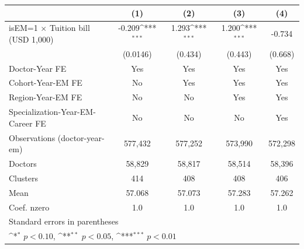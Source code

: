{
\def\sym#1{\ifmmode^{#1}\else\(^{#1}\)\fi}
\begin{tabular}{l*{4}{c}}
\hline\hline
                    &\multicolumn{1}{c}{(1)}         &\multicolumn{1}{c}{(2)}         &\multicolumn{1}{c}{(3)}         &\multicolumn{1}{c}{(4)}         \\
\hline
isEM=1 $\times$ Tuition bill (USD 1,000)&      -0.209\sym{***}&       1.293\sym{***}&       1.200\sym{***}&      -0.734         \\
                    &    (0.0146)         &     (0.434)         &     (0.443)         &     (0.668)         \\
[1em]
Doctor-Year FE      &         Yes         &         Yes         &         Yes         &         Yes         \\
[1em]
Cohort-Year-EM FE   &          No         &         Yes         &         Yes         &         Yes         \\
[1em]
Region-Year-EM FE   &          No         &          No         &         Yes         &         Yes         \\
[1em]
Specialization-Year-EM-Career FE&          No         &          No         &          No         &         Yes         \\
\hline
Observations (doctor-year-em)&     577,432         &     577,252         &     573,990         &     572,298         \\
Doctors             &      58,829         &      58,817         &      58,514         &      58,396         \\
Clusters            &         414         &         408         &         408         &         406         \\
Mean                &      57.068         &      57.073         &      57.283         &      57.262         \\
Coef. %
nzero               &         1.0         &         1.0         &         1.0         &         1.0         \\
\hline\hline
\multicolumn{5}{l}{\footnotesize Standard errors in parentheses}\\
\multicolumn{5}{l}{\footnotesize \sym{*} \(p<0.10\), \sym{**} \(p<0.05\), \sym{***} \(p<0.01\)}\\
\end{tabular}
}

